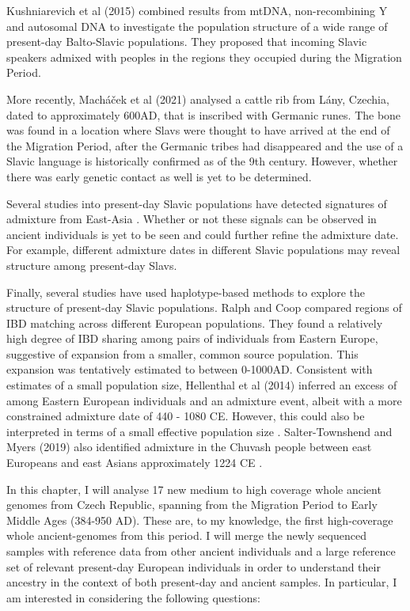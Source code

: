 Kushniarevich et al (2015) \cite{Kushniarevich23015} combined results from mtDNA, non-recombining Y and autosomal DNA to investigate the population structure of a wide range of present-day Balto-Slavic populations. They proposed that incoming Slavic speakers admixed with peoples in the regions they occupied during the Migration Period. 

More recently, Macháček et al (2021) \cite{MACHACEK2021105333} analysed a cattle rib from Lány, Czechia, dated to approximately 600AD, that is inscribed with Germanic runes. The bone was found in a location where Slavs were thought to have arrived at the end of the Migration Period, after the Germanic tribes had disappeared and the use of a Slavic language is historically confirmed as of the 9th century. However, whether there was early genetic contact as well is yet to be determined. 

Several studies into present-day Slavic populations have detected signatures of admixture from East-Asia \cite{Hellenthal2014, pankratov2016east, MOSAIC_2019, maliarchuk2008origin, qin2015quantitating}. Whether or not these signals can be observed in ancient individuals is yet to be seen and could further refine the admixture date. For example, different admixture dates in different Slavic populations may reveal structure among present-day Slavs. 

Finally, several studies have used haplotype-based methods to explore the structure of present-day Slavic populations. Ralph and Coop \cite{RalphCoop2013} compared regions of IBD matching  across different European populations. They found a relatively high degree of IBD sharing among pairs of individuals from Eastern Europe, suggestive of expansion from a smaller, common source population. This expansion was tentatively estimated to between 0-1000AD. Consistent with estimates of a small population size, Hellenthal et al (2014) \cite{Hellenthal2014} inferred an excess of among Eastern European individuals and an admixture event, albeit with a more constrained admixture date of 440 - 1080 CE. However, this could also be interpreted in terms of a small effective population size \cite{al2019estimating, ringbauer2017inferring}. Salter-Townshend and Myers (2019) also identified admixture in the Chuvash people between east Europeans and east Asians approximately 1224 CE \cite{MOSAIC_2019}.

In this chapter, I will analyse 17 new medium to high coverage whole ancient genomes from Czech Republic, spanning from the Migration Period to Early Middle Ages (384-950 AD). These are, to my knowledge, the first high-coverage whole ancient-genomes from this period. I will merge the newly sequenced samples with reference data from other ancient individuals and a large reference set of relevant present-day European individuals in order to understand their ancestry in the context of both present-day and ancient samples. In particular, I am interested in considering the following questions:

